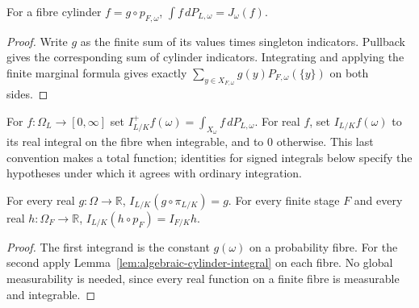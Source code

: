 \begin{lemma}\label{lem:algebraic-cylinder-integral}
\leanok
{}
For a fibre cylinder $f=g\circ p_{F,\omega}$,
$\int f\,dP_{L,\omega}=J_\omega(f)$.
\end{lemma}
\begin{proof}
Write $g$ as the finite sum of its values times singleton indicators.
Pullback gives the corresponding sum of cylinder indicators.
Integrating and applying the finite marginal formula gives exactly
$\sum_{y\in X_{F,\omega}}g(y)P_{F,\omega}(\{y\})$ on both sides.
\end{proof}

\begin{definition}\label{def:algebraic-fibre-integral}
\leanok
{}
For $f:\Omega_L\to[0,\infty]$ set
$I^+_{L/K}f(\omega)=\int_{X_\omega}f\,dP_{L,\omega}$.
For real $f$, set $I_{L/K}f(\omega)$ to its real integral on the fibre
when integrable, and to $0$ otherwise. This last convention makes a
total function; identities for signed integrals below specify the
hypotheses under which it agrees with ordinary integration.
\end{definition}

\begin{lemma}\label{lem:algebraic-integral-pullback}
\leanok
{}
For every real $g:\Omega\to\mathbb R$,
$I_{L/K}(g\circ\pi_{L/K})=g$. For every finite stage $F$ and every
real $h:\Omega_F\to\mathbb R$,
$I_{L/K}(h\circ p_F)=I_{F/K}h$.
\end{lemma}
\begin{proof}
The first integrand is the constant $g(\omega)$ on a probability fibre.
For the second apply Lemma~\ref{lem:algebraic-cylinder-integral} on
each fibre. No global measurability is needed, since every real function
on a finite fibre is measurable and integrable.
\end{proof}

